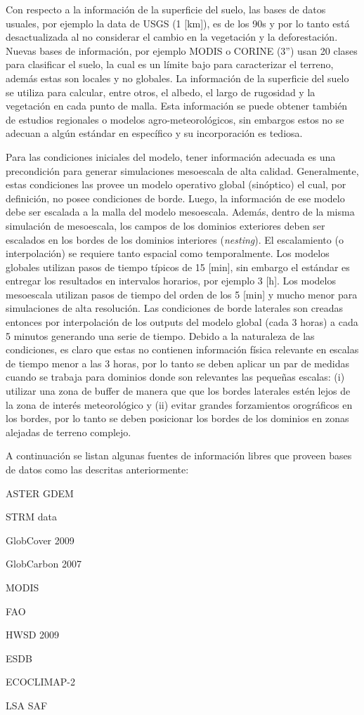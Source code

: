 Con respecto a la información de la superficie del suelo, las bases de datos usuales, por ejemplo la data de USGS (1 [km]), es de los 90s y por lo tanto está desactualizada al no considerar el cambio en la vegetación y la deforestación. Nuevas bases de información, por ejemplo MODIS o CORINE (3'') usan 20 clases para clasificar el suelo, la cual es un límite bajo para caracterizar el terreno, además estas son locales y no globales. La información de la superficie del suelo se utiliza para calcular, entre otros, el albedo, el largo de rugosidad y la vegetación en cada punto de malla. Esta información se puede obtener también de estudios regionales o modelos agro-meteorológicos, sin embargos estos no se adecuan a algún estándar en específico y su incorporación es tediosa.
 
Para las condiciones iniciales del modelo, tener información adecuada es una precondición para generar simulaciones mesoescala de alta calidad. Generalmente, estas condiciones las provee un modelo operativo global (sinóptico) el cual, por definición, no posee condiciones de borde. Luego, la información de ese modelo debe ser escalada a la malla del modelo mesoescala. Además, dentro de la misma simulación de mesoescala, los campos de los dominios exteriores deben ser escalados en los bordes de los dominios interiores (\emph{nesting}). El escalamiento (o interpolación) se requiere tanto espacial como temporalmente. Los modelos globales utilizan pasos de tiempo típicos de 15 [min], sin embargo el estándar es entregar los resultados en intervalos horarios, por ejemplo 3 [h]. Los modelos mesoescala utilizan pasos de tiempo del orden de los 5 [min] y mucho menor para simulaciones de alta resolución. Las condiciones de borde laterales son creadas entonces por interpolación de los outputs del modelo global (cada 3 horas) a cada 5 minutos generando una serie de tiempo. Debido a la naturaleza de las condiciones, es claro que estas no contienen información física relevante en escalas de tiempo menor a las 3 horas, por lo tanto se deben aplicar un par de medidas cuando se trabaja para dominios donde son relevantes las pequeñas escalas: (i) utilizar una zona de buffer de manera que que los bordes laterales estén lejos de la zona de interés meteorológico y (ii) evitar grandes forzamientos orográficos en los bordes, por lo tanto se deben posicionar los bordes de los dominios en zonas alejadas de terreno complejo. 

A continuación  se listan algunas fuentes de información libres que proveen bases de datos como las descritas anteriormente:
\begin{itemize*}
	\item ASTER GDEM
	\item STRM data
	\item GlobCover 2009
	\item GlobCarbon 2007
	\item MODIS
	\item FAO
	\item HWSD 2009
	\item ESDB
	\item ECOCLIMAP-2
	\item LSA SAF
\end{itemize*}
